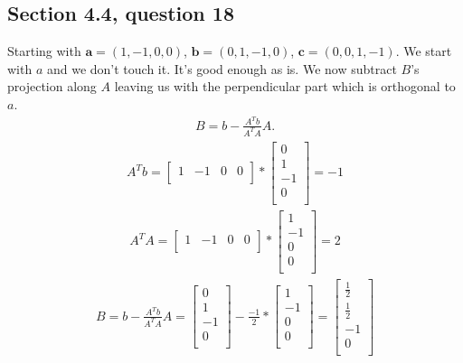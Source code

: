 \documentclass[a4paper,11pt]{article}
\newcommand{\mybf}[1]{\boldsymbol{#1}}
\begin{document}
\subsection*{Section 4.4, question 18}
Starting with $\mybf{a}=(1,-1,0,0)$, $\mybf{b}=(0,1,-1,0)$, $\mybf{c}=(0,0,1,-1)$.
We start with $a$ and we don't touch it. It's good enough as is.
We now subtract $B$'s projection along $A$ leaving us with the perpendicular part which is orthogonal to $a$.
\begin{align*}
B=b-\frac{A^Tb}{A^TA}A.
\end{align*}
\begin{align*}
A^Tb=
\begin{bmatrix}
1 & -1 & 0 & 0 \\
\end{bmatrix}
*
\begin{bmatrix}
0 \\
1 \\
-1 \\
0 \\
\end{bmatrix}
= -1
\end{align*}
\begin{align*}
A^TA=
\begin{bmatrix}
1 & -1 & 0 & 0 \\
\end{bmatrix}
*
\begin{bmatrix}
1 \\
-1 \\
0 \\
0 \\
\end{bmatrix}
= 2
\end{align*}
\begin{align*}
B=b-\frac{A^Tb}{A^TA}A= 
\begin{bmatrix}
0 \\
1 \\
-1 \\
0 \\
\end{bmatrix}
-
\frac{-1}{2}*
\begin{bmatrix}
1 \\
-1 \\
0 \\
0 \\
\end{bmatrix}
=
\begin{bmatrix}
\frac{1}{2} \\
\frac{1}{2} \\
-1 \\
0 \\
\end{bmatrix}
\end{align*}
\end{document}
